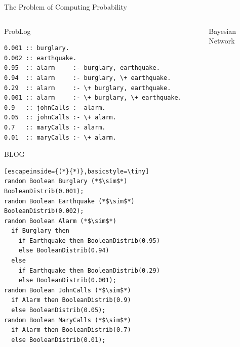 \documentclass{beamer}
\begin{document}
\begin{frame}[fragile]{The Problem of Computing Probability}
  \vspace{-0.75cm}
  \begin{columns}[t]
    \begin{column}{0.65\textwidth}
      \centering
      \begin{block}{ProbLog}
        \vspace{-0.2cm}
        \begin{lstlisting}[basicstyle=\tiny]
0.001 :: burglary.
0.002 :: earthquake.
0.95  :: alarm     :- burglary, earthquake.
0.94  :: alarm     :- burglary, \+ earthquake.
0.29  :: alarm     :- \+ burglary, earthquake.
0.001 :: alarm     :- \+ burglary, \+ earthquake.
0.9   :: johnCalls :- alarm.
0.05  :: johnCalls :- \+ alarm.
0.7   :: maryCalls :- alarm.
0.01  :: maryCalls :- \+ alarm.
        \end{lstlisting}
        \vspace{-0.2cm}
      \end{block}
      \vspace{-0.25cm}
      \begin{block}{BLOG}
        \vspace{-0.2cm}
        \begin{lstlisting}[escapeinside={(*}{*)},basicstyle=\tiny]
random Boolean Burglary (*$\sim$*) BooleanDistrib(0.001);
random Boolean Earthquake (*$\sim$*) BooleanDistrib(0.002);
random Boolean Alarm (*$\sim$*)
  if Burglary then
    if Earthquake then BooleanDistrib(0.95)
    else BooleanDistrib(0.94)
  else
    if Earthquake then BooleanDistrib(0.29)
    else BooleanDistrib(0.001);
random Boolean JohnCalls (*$\sim$*)
  if Alarm then BooleanDistrib(0.9)
  else BooleanDistrib(0.05);
random Boolean MaryCalls (*$\sim$*)
  if Alarm then BooleanDistrib(0.7)
  else BooleanDistrib(0.01);
        \end{lstlisting}
        \vspace{-0.2cm}
      \end{block}
    \end{column}
    \begin{column}{0.35\textwidth}
      \begin{block}{Bayesian Network}
        \centering
\end{block}
\end{column}
\end{columns}
\end{frame}
\end{document}
